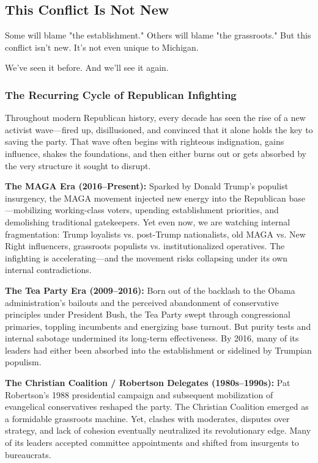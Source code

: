 \subsection{This Conflict Is Not New}

Some will blame "the establishment." Others will blame "the grassroots." But this conflict isn’t new. It’s not even unique to Michigan.

We’ve seen it before. And we’ll see it again.

\subsubsection{The Recurring Cycle of Republican Infighting}
Throughout modern Republican history, every decade has seen the rise of a new activist wave—fired up, disillusioned, and convinced that it alone holds the key to saving the party. That wave often begins with righteous indignation, gains influence, shakes the foundations, and then either burns out or gets absorbed by the very structure it sought to disrupt.

\textbf{The MAGA Era (2016–Present):} Sparked by Donald Trump’s populist insurgency, the MAGA movement injected new energy into the Republican base—mobilizing working-class voters, upending establishment priorities, and demolishing traditional gatekeepers. Yet even now, we are watching internal fragmentation: Trump loyalists vs. post-Trump nationalists, old MAGA vs. New Right influencers, grassroots populists vs. institutionalized operatives. The infighting is accelerating—and the movement risks collapsing under its own internal contradictions.

\textbf{The Tea Party Era (2009–2016):} Born out of the backlash to the Obama administration’s bailouts and the perceived abandonment of conservative principles under President Bush, the Tea Party swept through congressional primaries, toppling incumbents and energizing base turnout. But purity tests and internal sabotage undermined its long-term effectiveness. By 2016, many of its leaders had either been absorbed into the establishment or sidelined by Trumpian populism.

\textbf{The Christian Coalition / Robertson Delegates (1980s–1990s):} Pat Robertson’s 1988 presidential campaign and subsequent mobilization of evangelical conservatives reshaped the party. The Christian Coalition emerged as a formidable grassroots machine. Yet, clashes with moderates, disputes over strategy, and lack of cohesion eventually neutralized its revolutionary edge. Many of its leaders accepted committee appointments and shifted from insurgents to bureaucrats.

